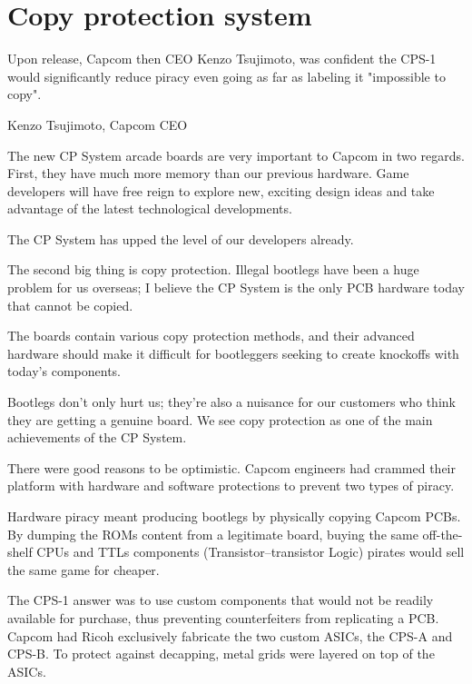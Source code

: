 
\section{Copy protection system}

Upon release, Capcom then CEO Kenzo Tsujimoto, was confident the CPS-1 would significantly reduce piracy even going as far as labeling it "impossible to copy".

\begin{q}{Kenzo Tsujimoto, Capcom CEO\cite{gamest38}}
    
The new CP System arcade boards are very important to Capcom in two regards. First, they have much more memory than our previous hardware. Game developers will have free reign to explore new, exciting design ideas and take advantage of the latest technological developments. 

The CP System has upped the level of our developers already.

The second big thing is copy protection. Illegal bootlegs have been a huge problem for us overseas; I believe the CP System is the only PCB hardware today that cannot be copied.

The boards contain various copy protection methods, and their advanced hardware should make it difficult for bootleggers seeking to create knockoffs with today's components. 

Bootlegs don't only hurt us; they're also a nuisance for our customers who think they are getting a genuine board. We see copy protection as one of the main achievements of the CP System.
\end{q}


There were good reasons to be optimistic. Capcom engineers had crammed their platform with hardware and software protections to prevent two types of piracy.


Hardware piracy meant producing bootlegs by physically copying Capcom PCBs. By dumping the ROMs content from a legitimate board, buying the same off-the-shelf CPUs and TTLs components (Transistor–transistor Logic) pirates would sell the same game  for cheaper.

The CPS-1 answer was to use custom components that would not be readily available for purchase, thus preventing counterfeiters from replicating a PCB. Capcom had Ricoh exclusively fabricate the two custom ASICs, the CPS-A and CPS-B. To protect against decapping, metal grids were layered on top of the ASICs\cite{arcadeHackerCPS1Rev}. 


